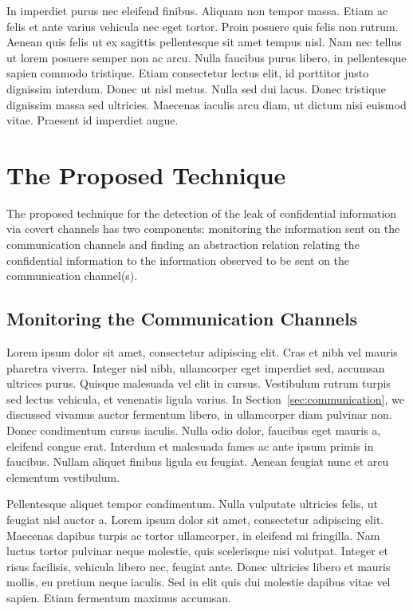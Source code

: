 

In imperdiet purus nec eleifend finibus. Aliquam non tempor massa. Etiam ac felis et ante varius vehicula nec eget tortor. Proin posuere quis felis non rutrum. Aenean quis felis ut ex sagittis pellentesque sit amet tempus nisl. Nam nec tellus ut lorem posuere semper non ac arcu. Nulla faucibus purus libero, in pellentesque sapien commodo tristique. Etiam consectetur lectus elit, id porttitor justo dignissim interdum. Donec ut nisl metus. Nulla sed dui lacus. Donec tristique dignissim massa sed ultricies. Maecenas iaculis arcu diam, ut dictum nisi euismod vitae. Praesent id imperdiet augue. 


\section{The Proposed Technique}
\label{sec:the_proposed_technique}

The proposed technique for the detection of the leak of confidential information via covert channels has two components: monitoring the information sent on the communication channels and finding an abstraction relation relating the confidential information to the information observed to be sent on the communication channel(s).

\subsection{Monitoring the Communication Channels}
\label{sub:monitoring_the_communication_channels}

Lorem ipsum dolor sit amet, consectetur adipiscing elit. Cras et nibh vel mauris pharetra viverra. Integer nisl nibh, ullamcorper eget imperdiet sed, accumsan ultrices purus. Quisque malesuada vel elit in cursus. Vestibulum rutrum turpis sed lectus vehicula, et venenatis ligula varius.  In Section~\ref{sec:communication}, we discussed vivamus auctor fermentum libero, in ullamcorper diam pulvinar non. Donec condimentum cursus iaculis. Nulla odio dolor, faucibus eget mauris a, eleifend congue erat. Interdum et malesuada fames ac ante ipsum primis in faucibus. Nullam aliquet finibus ligula eu feugiat. Aenean feugiat nunc et arcu elementum vestibulum. \newline



Pellentesque aliquet tempor condimentum. Nulla vulputate ultricies felis, ut feugiat nisl auctor a. Lorem ipsum dolor sit amet, consectetur adipiscing elit. Maecenas dapibus turpis ac tortor ullamcorper, in eleifend mi fringilla. Nam luctus tortor pulvinar neque molestie, quis scelerisque nisi volutpat. Integer et risus facilisis, vehicula libero nec, feugiat ante. Donec ultricies libero et mauris mollis, eu pretium neque iaculis. Sed in elit quis dui molestie dapibus vitae vel sapien. Etiam fermentum maximus accumsan.

